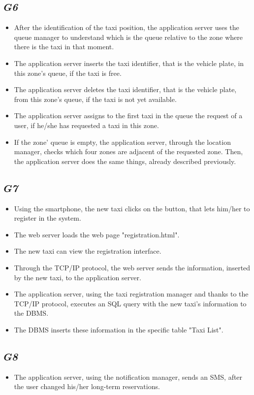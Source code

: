 	\subsection {\emph{G6}}
		\begin{itemize}
			\item After the identification of the taxi position, the application server uses the queue manager to understand which is the queue relative to the zone where there is the taxi in that moment.
			\item The application server inserts the taxi identifier, that is the vehicle plate, in this zone's queue, if the taxi is free.
			\item The application server deletes the taxi identifier, that is the vehicle plate, from this zone's queue, if the taxi is not yet available.
			\item The application server assigns to the first taxi in the queue the request of a user, if he/she has requested a taxi in this zone.
			\item If the zone' queue is empty, the application server, through the location manager, checks which four zones are adjacent of the requested zone. Then, the application server does the same things, already described previously.
		\end{itemize}
	\subsection {\emph{G7}}
		\begin{itemize}
			\item Using the smartphone, the new taxi clicks on the button, that lets him/her to register in the system.
			\item The web server loads the web page "registration.html".
			\item The new taxi can view the registration interface.
			\item Through the TCP/IP protocol, the web server sends the information, inserted by the new taxi, to the application server.
			\item The application server, using the taxi registration manager and thanks to the TCP/IP protocol, executes an SQL query with the new taxi's information to the DBMS.
			\item The DBMS inserts these information in the specific table "Taxi List".
		\end{itemize}
	\subsection {\emph{G8}}
		\begin{itemize}
			\item The application server, using the notification manager, sends an SMS, after the user changed his/her long-term reservations.
		\end{itemize}
